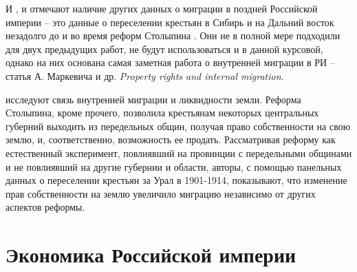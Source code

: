 \documentclass[a4paper,12pt]{article}
\let\oldsection\section
\renewcommand\section{\clearpage\oldsection}
\begin{document}

И \citeauthor{leasure_internal_1968}, и \citeauthor{anderson_internal_1980} отмечают наличие других данных о миграции в поздней Российской империи – это данные о переселении крестьян в Сибирь и на Дальний восток незадолго до и во время реформ Столыпина \citep{itogi_1910, itogi_1916}. Они не в полной мере подходили для двух предыдущих работ, не будут использоваться и в данной курсовой, однако на них основана самая заметная работа о внутренней миграции в РИ -- статья А. Маркевича и др. \emph{Property rights and internal migration}.

\citeauthor{chernina_property_2014} исследуют связь внутренней миграции и ликвидности земли. Реформа Столыпина, кроме прочего, позволила крестьянам некоторых центральных губерний выходить из передельных общин, получая право собственности на свою землю, и, соответственно, возможность ее продать. Рассматривая реформу как естественный эксперимент, повлиявший на провинции с передельными общинами и не повлиявший на другие губернии и области, авторы, с помощью панельных данных о переселении крестьян за Урал в 1901-1914, показывают, что изменение прав собственности на землю увеличило миграцию независимо от других аспектов реформы.



\section{Экономика Российской империи}

\end{document}
